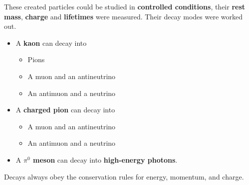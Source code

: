 These created particles could be studied in \textbf{controlled conditions}, their \textbf{rest mass}, \textbf{charge} and \textbf{lifetimes} were measured. Their decay modes were worked out.
\begin{itemize}
    \item A \textbf{kaon} can decay into
        \begin{itemize}
            \item Pions
            \item A muon and an antineutrino
            \item An antimuon and a neutrino
        \end{itemize}
    \item A \textbf{charged pion} can decay into
        \begin{itemize}
            \item A muon and an antineutrino
            \item An antimuon and a neutrino
        \end{itemize}
    \item A \textbf{$\pi^0$ meson} can decay into \textbf{high-energy photons}.
\end{itemize}

Decays always obey the conservation rules for energy, momentum, and charge.
